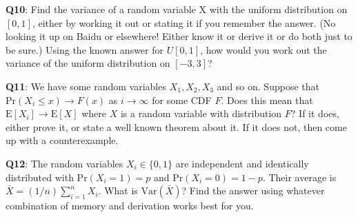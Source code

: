 \documentclass[]{article}
\begin{document}
\textbf{Q10}: Find the variance of a random variable X with the uniform
distribution on \([0, 1]\), either by working it out or stating it if
you remember the answer. (No looking it up on Baidu or elsewhere! Either
know it or derive it or do both just to be sure.) Using the known answer
for \(U[0, 1]\), how would you work out the variance of the uniform
distribution on \([-3, 3]\)?

\textbf{Q11}: We have some random variables \(X_1, X_2, X_3\) and so on.
Suppose that \(\mathrm{Pr}(X_i\le x)\to F(x)\) as \(i\to \infty\) for
some CDF \(F\). Does this mean that \(\mathrm{E}[X_i]\to \mathrm{E}[X]\)
where \(X\) is a random variable with distribution \(F\)? If it does,
either prove it, or state a well known theorem about it. If it does not,
then come up with a counterexample.

\textbf{Q12}: The random variables \(X_i\in\{0,1\}\) are independent and
identically distributed with \(\mathrm{Pr}(X_i = 1) = p\) and
\(\mathrm{Pr}(X_i = 0) = 1-p\). Their average is
\(\bar X = (1/n)\sum_{i=1}^n X_i\). What is \(\mathrm{Var}(\bar X)\)?
Find the answer using whatever combination of memory and derivation
works best for you.
\end{document}
